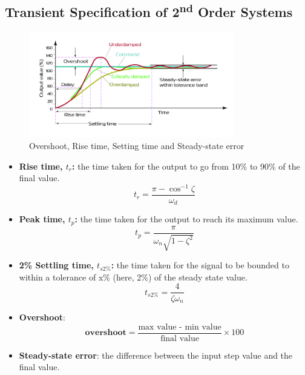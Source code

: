 \subsection{Transient Specification of 2\textsuperscript{nd} Order Systems}
\begin{figure}[H] 
    \centering
    \includegraphics[width=0.8\textwidth]{images/PID_response.jpg}
    \caption{Overshoot, Rise time, Setting time and Steady-state error \protect\footnotemark}
\end{figure}

\begin{itemize}
    \item \textbf{Rise time, $t_{r}$:} the time taken for the output to go from 10\% to 90\% of the final value.
    \[t_{r} = \frac{\pi-\cos^{-1}\zeta}{\omega_{d}}\]
    
    \item \textbf{Peak time, $t_{p}$:} the time taken for the output to reach its maximum value.
    \[t_{p} = \frac{\pi}{\omega_{n}\sqrt{1-\zeta^{2}}}\]
    
    \item \textbf{2\% Settling time, $t_{s2\%}$:} the time taken for the signal to be bounded to within a tolerance of x\% (here, 2\%) of the steady state value.
    \[t_{s2\%} = \frac{4}{\zeta\omega_{n}}\]
    
    \item \textbf{Overshoot}: 
    \[\textbf{overshoot} = \frac{\text{max value - min value}}{\text{final value}}\times 100\]
    
    \item \textbf{Steady-state error}: the difference between the input step value and the final value.
\end{itemize}
